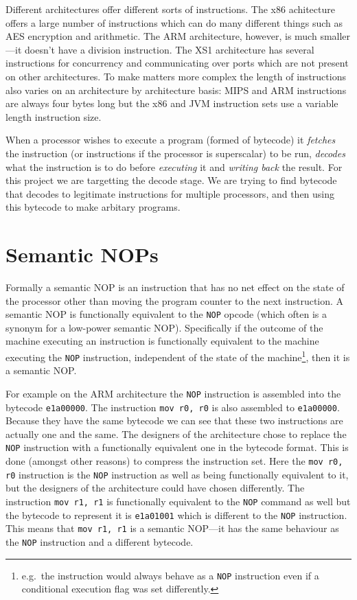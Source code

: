 \documentclass[]{book}
\begin{document}
Different architectures offer different sorts of instructions. The x86
achitecture offers a large number of instructions which can do many
different things such as AES encryption and arithmetic\autocite{refx86}.
The ARM architecture\autocite{Seal:2000vd}, however, is much
smaller---it doesn't have a division instruction. The XS1
architecture\autocite{May:ua} has several instructions for concurrency
and communicating over ports which are not present on other
architectures. To make matters more complex the length of instructions
also varies on an architecture by architecture basis: MIPS and ARM
instructions are always four bytes long but the x86 and JVM instruction
sets use a variable length instruction size.

When a processor wishes to execute a program (formed of bytecode) it
\emph{fetches} the instruction (or instructions if the processor is
superscalar) to be run, \emph{decodes} what the instruction is to do
before \emph{executing} it and \emph{writing back} the result. For this
project we are targetting the decode stage. We are trying to find
bytecode that decodes to legitimate instructions for multiple
processors, and then using this bytecode to make arbitary programs.

\section{Semantic NOPs}

Formally a semantic NOP is an instruction that has no net effect on the
state of the processor other than moving the program counter to the next
instruction. A semantic NOP is functionally equivalent to the
\lstinline!NOP! opcode (which often is a synonym for a low-power
semantic NOP). Specifically if the outcome of the machine executing an
instruction is functionally equivalent to the machine executing the
\lstinline!NOP! instruction, independent of the state of the
machine\footnote{e.g.~the instruction would always behave as a
  \lstinline!NOP! instruction even if a conditional execution flag was
  set differently.}, then it is a semantic NOP.

For example on the ARM architecture\autocite{Seal:2000vd} the
\lstinline!NOP! instruction is assembled into the bytecode
\lstinline!e1a00000!. The instruction \lstinline!mov r0, r0! is also
assembled to \lstinline!e1a00000!. Because they have the same bytecode
we can see that these two instructions are actually one and the same.
The designers of the architecture chose to replace the \lstinline!NOP!
instruction with a functionally equivalent one in the bytecode format.
This is done (amongst other reasons) to compress the instruction set.
Here the \lstinline!mov r0, r0! instruction is the \lstinline!NOP!
instruction as well as being functionally equivalent to it, but the
designers of the architecture could have chosen differently. The
instruction \lstinline!mov r1, r1! is functionally equivalent to the
\lstinline!NOP! command as well but the bytecode to represent it is
\lstinline!e1a01001! which is different to the \lstinline!NOP!
instruction. This means that \lstinline!mov r1, r1! is a semantic
NOP---it has the same behaviour as the \lstinline!NOP! instruction and a
different bytecode.
\end{document}
